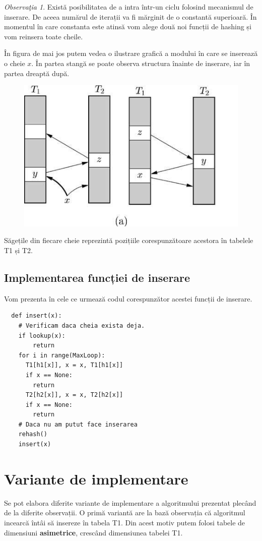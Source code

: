 \documentclass[a4paper]{article}
\theoremstyle{remark}
\newtheorem{remark}{Observa\c{t}ia}
\theoremstyle{definition}
\begin{document}
\begin{remark}Există posibilitatea de a intra într-un ciclu folosind mecanismul de inserare. De aceea numărul de iterații va fi mărginit de o constantă superioară. În momentul în care constanta este atinsă vom alege două noi funcții de hashing și vom reinsera toate cheile.
\end{remark}

În figura de mai jos putem vedea o ilustrare grafică a modului în care se inserează o cheie $x$. În partea stangă se poate observa structura înainte de inserare, iar în partea dreaptă după.

\begin{figure}[h]
\includegraphics[width=0.4\linewidth]{cuckoo.jpg}
\end{figure}

Săgețile din fiecare cheie reprezintă pozițiile corespunzătoare acestora în tabelele T1 și T2. 

\newpage

\subsection{Implementarea funcției de inserare}

Vom prezenta în cele ce urmează codul corespunzător acestei funcții de inserare.

\begin{verbatim}
  def insert(x):
  	# Verificam daca cheia exista deja.
  	if lookup(x):
  		return
   	for i in range(MaxLoop):
   	  T1[h1[x]], x = x, T1[h1[x]]
   	  if x == None:
   	    return
   	  T2[h2[x]], x = x, T2[h2[x]]
   	  if x == None:
   	    return
   	# Daca nu am putut face inserarea
   	rehash()
   	insert(x)
\end{verbatim}

\section{Variante de implementare}

Se pot elabora diferite variante de implementare a algoritmului prezentat plecând de la diferite observații. O primă variantă are la bază observația că algoritmul incearcă întâi să insereze în tabela T1. Din acest motiv putem folosi tabele de dimensiuni \textbf{asimetrice}, crescând dimensiunea tabelei T1.
\end{document}
